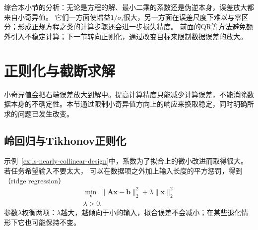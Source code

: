 综合本小节的分析：无论是方程的解、最小二乘的系数还是伪逆本身，误差放大都来自小奇异值。
它们一方面使增益$1/\sigma_i$很大，另一方面在误差尺度下难以与零区分；形成正规方程之类的计算步骤还会进一步损失精度。
前面的QR等方法避免额外引入不稳定计算；下一节转向正则化，通过改变目标来限制数据误差的放大。

\section{正则化与截断求解}
\label{sec:ls-truncated-svd-ridge}

小奇异值会把右端误差放大到解中。提高计算精度只能减少计算误差，不能消除数据本身的不确定性。本节通过限制小奇异值方向上的响应来换取稳定，同时明确所求的问题已发生改变。

\subsection{岭回归与Tikhonov正则化}
\label{sec:ls-regularized-ls}

示例~\ref{ex:ls-nearly-collinear-design}中，系数为了拟合上的微小改进而取得很大。若任务希望输入不要太大，
可以在数据项之外加上输入长度的平方惩罚，得到（ridge regression）
\begin{equation}
\begin{gathered}
\min_{\bm x}\ \lVert\bm A\bm x-\bm b\rVert_2^2+\lambda\lVert\bm x\rVert_2^2\\
\lambda>0.
\end{gathered}
\label{eq:ls-ridge-objective}
\end{equation}
参数$\lambda$权衡两项：$\lambda$越大，越倾向于小的输入，拟合误差不会减小；在某些退化情形下它也可能保持不变。

